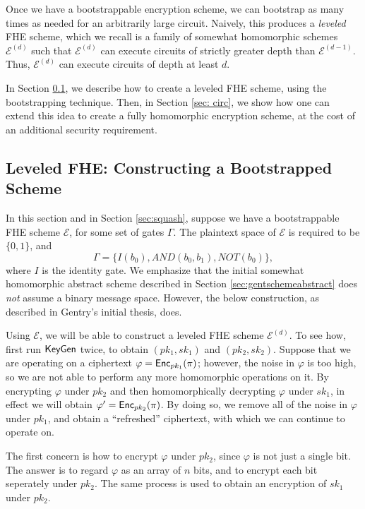 Once we have a bootstrappable encryption scheme, we can bootstrap as many times as needed for an arbitrarily large circuit. Naively, this produces a \emph{leveled} FHE scheme, which we recall is a family of somewhat homomorphic schemes $\mathcal{E}^{(d)}$ such that $\mathcal{E}^{(d)}$ can execute circuits of strictly greater depth than $\mathcal{E}^{(d-1)}$. Thus, $\mathcal{E}^{(d)}$ can execute circuits of depth at least $d$.

In Section \ref{sec:bootstrap}, we describe how to create a leveled FHE scheme, using the bootstrapping technique. Then, in Section \ref{sec: circ}, we show how one can extend this idea to create a fully homomorphic encryption scheme, at the cost of an additional security requirement.

\subsection{Leveled FHE: Constructing a Bootstrapped Scheme}
\label{sec:bootstrap}

In this section and in Section \ref{sec:squash}, suppose we have a bootstrappable FHE scheme $\mathcal{E}$, for some set of gates $\Gamma$. The plaintext space of $\mathcal{E}$ is required to be $\{0,1\}$, and
\[\Gamma = \{I(b_0), \textit{AND}(b_0, b_1), \textit{NOT}(b_0)\},\] where $I$ is the identity gate. We emphasize that the initial somewhat homomorphic abstract scheme described in Section \ref{sec:gentschemeabstract} does \emph{not} assume a binary message space. However, the below construction, as described in Gentry's initial thesis, does.



Using $\mathcal{E}$, we will be able to construct a leveled FHE scheme $\mathcal{E}^{(d)}$. To see how, first run ${\sf KeyGen}$ twice, to obtain $(pk_1, sk_1)$ and $(pk_2, sk_2)$. Suppose that we are operating on a ciphertext $\varphi = {\sf Enc}_{pk_1}(\pi)$; however, the noise in $\varphi$ is too high, so we are not able to perform any more homomorphic operations on it. By encrypting $\varphi$ under $pk_2$ and then homomorphically decrypting $\varphi$ under $sk_1$, in effect we will obtain $\varphi' = {\sf Enc}_{pk_2}(\pi)$. By doing so, we remove all of the noise in $\varphi$ under $pk_1$, and obtain a ``refreshed'' ciphertext, with which we can continue to operate on.

The first concern is how to encrypt $\varphi$ under $pk_2$, since $\varphi$ is not just a single bit. The answer is to regard $\varphi$ as an array of $n$ bits, and to encrypt each bit seperately under $pk_2$. The same process is used to obtain an encryption of $sk_1$ under $pk_2$.

